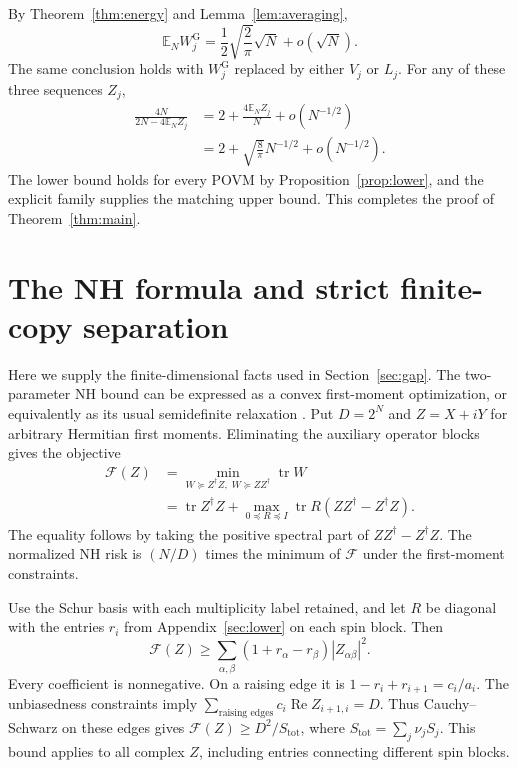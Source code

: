 \documentclass[aps,pra,reprint,superscriptaddress,longbibliography]{revtex4-2}
\theoremstyle{remark}
\DeclareMathOperator{\tr}{tr}
\newcommand{\E}{\mathbb E}
\newcommand{\g}{\mathrm G}
\begin{document}
By Theorem~\ref{thm:energy} and Lemma~\ref{lem:averaging},
\begin{equation}
 \E_N W_j^{\g}=\frac12\sqrt{\frac2\pi}\sqrt N+o(\sqrt N).
 \label{eq:averaged-W}
\end{equation}
The same conclusion holds with $W_j^{\g}$ replaced by either
$V_j$ or $L_j$. For any of these three sequences $Z_j$,
\begin{equation}
\begin{aligned}
\frac{4N}{2N-4\E_NZ_j}
 &=2+\frac{4\E_NZ_j}{N}+o(N^{-1/2})\\
 &=2+\sqrt{\frac8\pi}N^{-1/2}+o(N^{-1/2}).
\end{aligned}
\label{eq:risk-expansion}
\end{equation}
The lower bound holds for every POVM by
Proposition~\ref{prop:lower}, and the explicit family supplies the
matching upper bound. This completes the proof of
Theorem~\ref{thm:main}.


\section{The NH formula and strict finite-copy separation}\label{app:NH}
Here we supply the finite-dimensional facts used in
Section~\ref{sec:gap}. The two-parameter NH bound can be expressed
as a convex first-moment optimization, or equivalently as its usual
semidefinite relaxation \cite{HayashiOuyang2023,ZhangHayashi2026}.
Put $D=2^N$ and $Z=X+iY$ for arbitrary Hermitian first moments.
Eliminating the auxiliary operator blocks gives the objective
\[
\begin{aligned}
\mathcal F(Z)
 &=\min_{W\succeq Z^\dagger Z,\;W\succeq ZZ^\dagger}\tr W\\
 &=\tr Z^\dagger Z+
   \max_{0\preceq R\preceq I}\tr R(ZZ^\dagger-Z^\dagger Z).
\end{aligned}
\]
The equality follows by taking the positive spectral part of
$ZZ^\dagger-Z^\dagger Z$. The normalized NH risk is $(N/D)$ times
the minimum of $\mathcal F$ under the first-moment constraints.

Use the Schur basis with each multiplicity label retained, and let
$R$ be diagonal with the entries $r_i$ from Appendix~\ref{sec:lower}
on each spin block. Then
\[
 \mathcal F(Z)\geq
 \sum_{\alpha,\beta}(1+r_\alpha-r_\beta)|Z_{\alpha\beta}|^2.
\]
Every coefficient is nonnegative. On a raising edge it is
$1-r_i+r_{i+1}=c_i/a_i$. The unbiasedness constraints imply
$\sum_{\text{raising edges}}c_i\operatorname{Re}Z_{i+1,i}=D$.
Thus Cauchy--Schwarz on these edges gives
$\mathcal F(Z)\geq D^2/S_{\mathrm{tot}}$, where
$S_{\mathrm{tot}}=\sum_j\nu_jS_j$. This bound applies to all complex
$Z$, including entries connecting different spin blocks.
\end{document}
